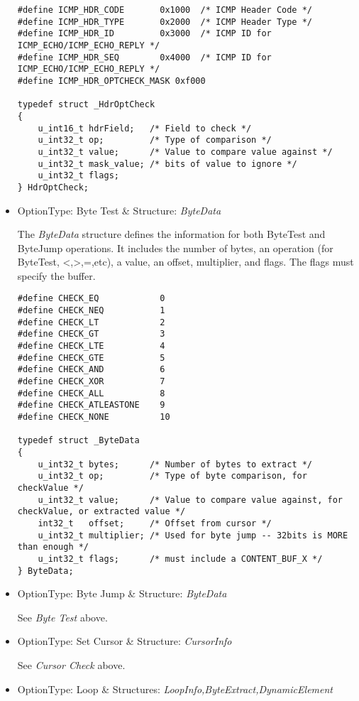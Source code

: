 \documentclass[english]{report}
\begin{document}
\begin{itemize}
\begin{verbatim}
#define ICMP_HDR_CODE       0x1000  /* ICMP Header Code */
#define ICMP_HDR_TYPE       0x2000  /* ICMP Header Type */
#define ICMP_HDR_ID         0x3000  /* ICMP ID for ICMP_ECHO/ICMP_ECHO_REPLY */
#define ICMP_HDR_SEQ        0x4000  /* ICMP ID for ICMP_ECHO/ICMP_ECHO_REPLY */
#define ICMP_HDR_OPTCHECK_MASK 0xf000

typedef struct _HdrOptCheck
{
    u_int16_t hdrField;   /* Field to check */
    u_int32_t op;         /* Type of comparison */
    u_int32_t value;      /* Value to compare value against */
    u_int32_t mask_value; /* bits of value to ignore */
    u_int32_t flags;
} HdrOptCheck;
\end{verbatim}

\item {OptionType: Byte Test \& Structure: {\em ByteData}}

The {\em ByteData} structure defines the information for both ByteTest and
ByteJump operations.  It includes the number of bytes, an operation (for
ByteTest, <,>,=,etc), a value, an offset, multiplier, and flags.  The flags
must specify the buffer.

\begin{verbatim}
#define CHECK_EQ            0
#define CHECK_NEQ           1
#define CHECK_LT            2
#define CHECK_GT            3
#define CHECK_LTE           4
#define CHECK_GTE           5
#define CHECK_AND           6
#define CHECK_XOR           7
#define CHECK_ALL           8
#define CHECK_ATLEASTONE    9
#define CHECK_NONE          10

typedef struct _ByteData
{
    u_int32_t bytes;      /* Number of bytes to extract */
    u_int32_t op;         /* Type of byte comparison, for checkValue */
    u_int32_t value;      /* Value to compare value against, for checkValue, or extracted value */
    int32_t   offset;     /* Offset from cursor */
    u_int32_t multiplier; /* Used for byte jump -- 32bits is MORE than enough */
    u_int32_t flags;      /* must include a CONTENT_BUF_X */
} ByteData;
\end{verbatim}

\item {OptionType: Byte Jump \& Structure: {\em ByteData}}

See {\em Byte Test} above.

\item {OptionType: Set Cursor \& Structure: {\em CursorInfo}}

See {\em Cursor Check} above.

\item {OptionType: Loop \& Structures: {\em LoopInfo,ByteExtract,DynamicElement}}


\end{itemize}
\end{document}
